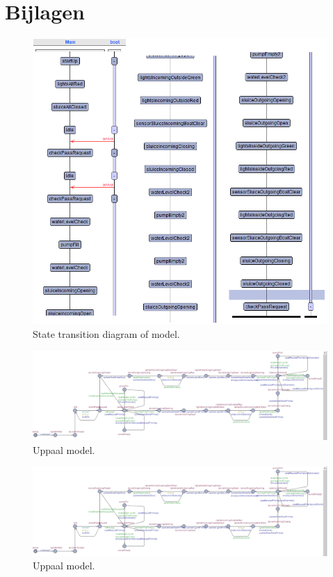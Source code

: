\documentclass{article}
\begin{document}
\newpage
\section{Bijlagen}

\begin{figure}[!h]
	\centering
	\includegraphics[width=\textwidth]{images/State_diagram2.png}
    \caption{State transition diagram of model.}
\end{figure}
\newpage
\begin{figure}[!h]
	\centering
	\includegraphics[width=\textwidth]{images/Uppaal_model.png}
    \caption{Uppaal model.}
    \label{fig:uppaalmodel}
\end{figure}
\newpage
\begin{figure}
	\centering
	\includegraphics[width=\textwidth]{images/Uppaal_model.png}
    \caption{Uppaal model.}
    \label{fig:uppaalmodelsideways}
\end{figure}
\clearpage
\newpage



\end{document}
